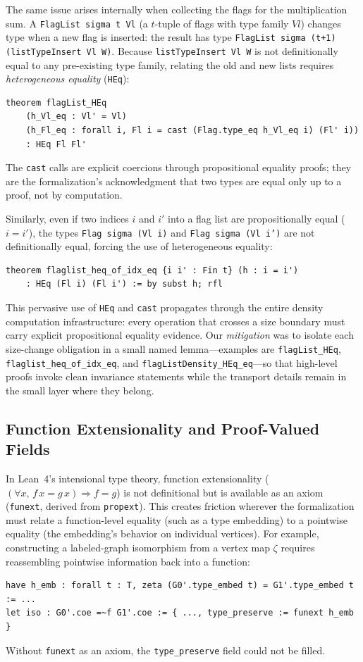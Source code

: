 \documentclass{article}
\newcommand{\lean}[1]{\texttt{#1}}
\begin{document}
The same issue arises internally when collecting the flags for the
multiplication sum.  A \lean{FlagList sigma t Vl} (a $t$-tuple of flags with
type family $Vl$) changes type when a new flag is inserted: the result has
type \lean{FlagList sigma (t+1) (listTypeInsert Vl W)}.  Because
\lean{listTypeInsert Vl W} is not definitionally equal to any pre-existing
type family, relating the old and new lists requires \emph{heterogeneous
equality} (\lean{HEq}):
\begin{lstlisting}
theorem flagList_HEq
    (h_Vl_eq : Vl' = Vl)
    (h_Fl_eq : forall i, Fl i = cast (Flag.type_eq h_Vl_eq i) (Fl' i))
    : HEq Fl Fl'
\end{lstlisting}
The \lean{cast} calls are explicit coercions through propositional equality
proofs; they are the formalization's acknowledgment that two types are equal
only up to a proof, not by computation.

Similarly, even if two indices $i$ and $i'$ into a flag list are
propositionally equal ($i = i'$), the types \lean{Flag sigma (Vl i)} and
\lean{Flag sigma (Vl i')} are not definitionally equal, forcing the use of
heterogeneous equality:
\begin{lstlisting}
theorem flaglist_heq_of_idx_eq {i i' : Fin t} (h : i = i')
    : HEq (Fl i) (Fl i') := by subst h; rfl
\end{lstlisting}
This pervasive use of \lean{HEq} and \lean{cast} propagates through the entire
density computation infrastructure: every operation that crosses a size
boundary must carry explicit propositional equality evidence.  Our
\emph{mitigation} was to isolate each size-change obligation in a small named
lemma---examples are \lean{flagList\_HEq},
\lean{flaglist\_heq\_of\_idx\_eq}, and \lean{flagListDensity\_HEq\_eq}---so
that high-level proofs invoke clean invariance statements while the transport
details remain in the small layer where they belong.

\subsection{Function Extensionality and Proof-Valued Fields}

In Lean~4's intensional type theory, function extensionality
($(\forall x,\, f\,x = g\,x) \Rightarrow f = g$) is not definitional but is
available as an axiom (\lean{funext}, derived from \lean{propext}).  This
creates friction wherever the formalization must relate a function-level
equality (such as a type embedding) to a pointwise equality (the embedding's
behavior on individual vertices).  For example, constructing a labeled-graph
isomorphism from a vertex map $\zeta$ requires reassembling pointwise
information back into a function:
\begin{lstlisting}
have h_emb : forall t : T, zeta (G0'.type_embed t) = G1'.type_embed t := ...
let iso : G0'.coe =~f G1'.coe := { ..., type_preserve := funext h_emb }
\end{lstlisting}
Without \lean{funext} as an axiom, the \lean{type\_preserve} field could not
be filled.
\end{document}
